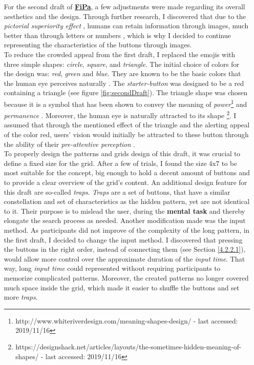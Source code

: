 For the second draft of \underline{\textbf{FiPa}}, a few adjustments were made  regarding its overall aesthetics and the design. Through further research, I discovered that due to the \textit{pictorial superiority effect} \cite{pictorial}, humans can retain information through images, much better than through letters or numbers \cite{pictorial, 2014}, which is why I decided to continue representing the characteristics of the buttons through images.\\
To reduce the crowded appeal from the first draft, I replaced the emojis with three simple shapes: \textit{circle}, \textit{square}, and \textit{triangle}. The initial choice of colors for the design was: \textit{red}, \textit{green} and \textit{blue}. They are known to be the basic colors that the human eye perceives naturally \cite{Butz2014}. The \textit{starter-button} was designed to be a red containing a triangle (see figure \ref{fig:secondDraft}). The triangle shape was chosen because it is a symbol that has been shown to convey the meaning of \textit{power}\footnote{http://www.whiteriverdesign.com/meaning-shapes-design/ - last accessed: 2019/11/16} and \textit{permanence} \cite{Frutiger1998}.  Moreover, the human eye is naturally attracted to its shape \footnote{https://designshack.net/articles/layouts/the-sometimes-hidden-meaning-of-shapes/ - last accessed: 2019/11/16}. I assumed that through the mentioned effect of the triangle and the alerting appeal of the color red, users' vision would initially be attracted to these button through the ability of their \textit{pre-attentive perception} \cite{Butz2014}. \\

To properly design the patterns and grids design of this draft, it was crucial to define a fixed size for the grid. After a few of trials, I found the size 4x7 to be most suitable for the concept, big enough to hold a decent amount of buttons and to provide a clear overview of the grid's content. An additional design feature for this draft are so-called \textit{traps}. \textit{Traps} are a set of buttons, that have a similar constellation and set of characteristics as the hidden pattern, yet are not identical to it. Their purpose is to mislead the user, during the \textbf{mental task} and thereby elongate the search process as needed. Another modification made was the input method. As participants did not improve of the complexity of the long pattern, in the first draft, I decided to change the input method. I discovered that pressing the buttons in the right order, instead of connecting them (see Section \ref{4.2.2.1}), would allow more control over the approximate duration of the \textit{input time}. That way, long \textit{input time} could represented without requiring participants to memorize complicated patterns. Moreover, the created patterns no longer covered much space inside the grid, which made it easier to shuffle the buttons and set more \textit{traps}. 

